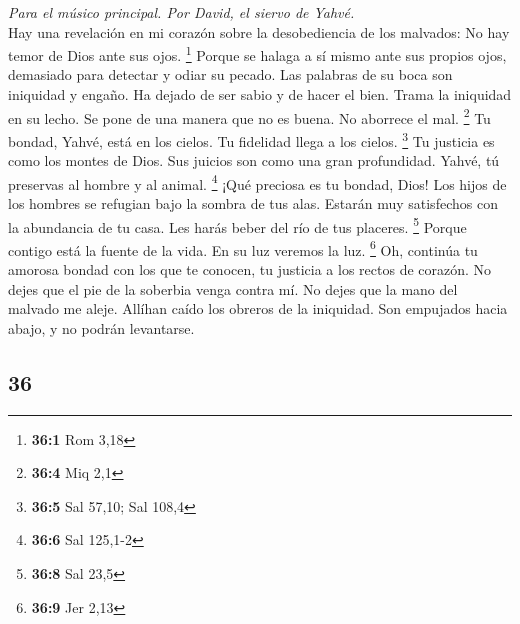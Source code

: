 \begin{paracol}{2}
\emph{Para el músico principal. Por David, el siervo de Yahvé.}\\
 Hay una revelación en mi corazón sobre la desobediencia
de los malvados: No hay temor de Dios ante sus ojos. \footnote{\textbf{36:1}
  Rom 3,18}  Porque se halaga a sí mismo ante sus propios
ojos, demasiado para detectar y odiar su pecado.  Las
palabras de su boca son iniquidad y engaño. Ha dejado de ser sabio y de
hacer el bien.  Trama la iniquidad en su lecho. Se pone de
una manera que no es buena. No aborrece el mal. \footnote{\textbf{36:4}
  Miq 2,1}  Tu bondad, Yahvé, está en los cielos. Tu
fidelidad llega a los cielos. \footnote{\textbf{36:5} Sal 57,10; Sal
  108,4}  Tu justicia es como los montes de Dios. Sus
juicios son como una gran profundidad. Yahvé, tú preservas al hombre y
al animal. \footnote{\textbf{36:6} Sal 125,1-2}  ¡Qué
preciosa es tu bondad, Dios! Los hijos de los hombres se refugian bajo
la sombra de tus alas.  Estarán muy satisfechos con la
abundancia de tu casa. Les harás beber del río de tus placeres.
\footnote{\textbf{36:8} Sal 23,5}  Porque contigo está la
fuente de la vida. En su luz veremos la luz. \footnote{\textbf{36:9} Jer
  2,13}  Oh, continúa tu amorosa bondad con los que te
conocen, tu justicia a los rectos de corazón.  No dejes
que el pie de la soberbia venga contra mí. No dejes que la mano del
malvado me aleje.  Allíhan caído los obreros de la
iniquidad. Son empujados hacia abajo, y no podrán levantarse.

\switchcolumn
\begin{otherlanguage}{english}

\hypertarget{section-71}{%
\section{36}\label{section-71}}


\end{otherlanguage}
\end{paracol}
